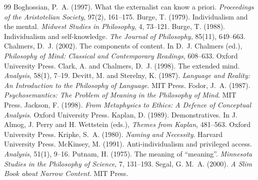 \documentclass{situationist-preprint}
\begin{document}
\begin{thebibliography}{99}\small
{} Boghossian, P.~A. (1997). What the externalist can know a priori. \emph{Proceedings of the Aristotelian Society}, 97(2), 161--175.
 Burge, T. (1979). Individualism and the mental. \emph{Midwest Studies in Philosophy}, 4, 73--121.
 Burge, T. (1988). Individualism and self-knowledge. \emph{The Journal of Philosophy}, 85(11), 649--663.
 Chalmers, D.~J. (2002). The components of content. In D.~J. Chalmers (ed.), \emph{Philosophy of Mind: Classical and Contemporary Readings}, 608--633. Oxford University Press.
 Clark, A. and Chalmers, D.~J. (1998). The extended mind. \emph{Analysis}, 58(1), 7--19.
 Devitt, M. and Sterelny, K. (1987). \emph{Language and Reality: An Introduction to the Philosophy of Language}. MIT Press.
 Fodor, J.~A. (1987). \emph{Psychosemantics: The Problem of Meaning in the Philosophy of Mind}. MIT Press.
 Jackson, F. (1998). \emph{From Metaphysics to Ethics: A Defence of Conceptual Analysis}. Oxford University Press.
 Kaplan, D. (1989). Demonstratives. In J. Almog, J. Perry and H. Wettstein (eds.), \emph{Themes from Kaplan}, 481--563. Oxford University Press.
 Kripke, S.~A. (1980). \emph{Naming and Necessity}. Harvard University Press.
 McKinsey, M. (1991). Anti-individualism and privileged access. \emph{Analysis}, 51(1), 9--16.
 Putnam, H. (1975). The meaning of \enquote{meaning}. \emph{Minnesota Studies in the Philosophy of Science}, 7, 131--193.
 Segal, G. M.~A. (2000). \emph{A Slim Book about Narrow Content}. MIT Press.
\end{thebibliography}
\end{document}
